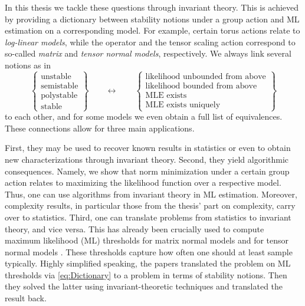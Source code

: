 In this thesis we tackle these questions through invariant theory. This is achieved by providing a dictionary between stability notions under a group action and ML estimation on a corresponding model. For example, certain torus actions relate to \emph{log-linear models}, while the operator and the tensor scaling action correspond to so-called \emph{matrix} and \emph{tensor normal models}, respectively. We always link several notions as in
\begin{equation}\label{eq:Dictionary}
	\left\{ \begin{matrix}
		\text{unstable} \\ 
		\text{semistable} \\ 
		\text{polystable} \\ 
		\text{stable} 
	\end{matrix} \right\} 
	\qquad \longleftrightarrow \qquad 
	\left\{ \begin{matrix}
		\text{likelihood unbounded from above} \\ 
		\text{likelihood bounded from above} \\ 
		\text{MLE exists} \\ 
		\text{MLE exists uniquely} 
	\end{matrix} \right\} 
\end{equation}
 to each other, and for some models we even obtain a full list of equivalences.
These connections allow for three main applications.

First, they may be used to recover known results in statistics or even to obtain new characterizations through invariant theory. Second, they yield algorithmic consequences. Namely, we show that norm minimization under a certain group action relates to maximizing the likelihood function over a respective model. Thus, one can use algorithms from invariant theory in ML estimation. Moreover, complexity results, in particular those from the thesis' part on complexity, carry over to statistics.
Third, one can translate problems from statistics to invariant theory, and vice versa. 
This has already been crucially used to compute maximum likelihood (ML) thresholds for matrix normal models \cite{DM21MatrixNormal} and for tensor normal models \cite{DMW22TensorNormal}. These thresholds capture how often one should at least sample typically. Highly simplified speaking, the papers \cite{DM21MatrixNormal, DMW22TensorNormal} translated the problem on ML thresholds via \eqref{eq:Dictionary} to a problem in terms of stability notions. Then they solved the latter using invariant-theoretic techniques and translated the result back. 

